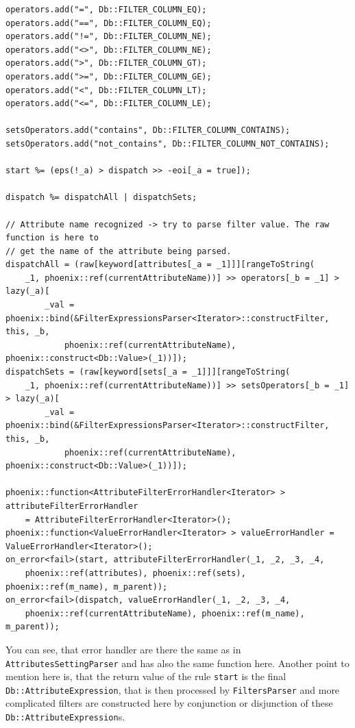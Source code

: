 \documentclass[deska]{subfiles}
\begin{document}
\begin{verbatim}
operators.add("=", Db::FILTER_COLUMN_EQ);
operators.add("==", Db::FILTER_COLUMN_EQ);
operators.add("!=", Db::FILTER_COLUMN_NE);
operators.add("<>", Db::FILTER_COLUMN_NE);
operators.add(">", Db::FILTER_COLUMN_GT);
operators.add(">=", Db::FILTER_COLUMN_GE);
operators.add("<", Db::FILTER_COLUMN_LT);
operators.add("<=", Db::FILTER_COLUMN_LE);

setsOperators.add("contains", Db::FILTER_COLUMN_CONTAINS);
setsOperators.add("not_contains", Db::FILTER_COLUMN_NOT_CONTAINS);

start %= (eps(!_a) > dispatch >> -eoi[_a = true]);

dispatch %= dispatchAll | dispatchSets;

// Attribute name recognized -> try to parse filter value. The raw function is here to
// get the name of the attribute being parsed.
dispatchAll = (raw[keyword[attributes[_a = _1]]][rangeToString(
    _1, phoenix::ref(currentAttributeName))] >> operators[_b = _1] > lazy(_a)[
        _val = phoenix::bind(&FilterExpressionsParser<Iterator>::constructFilter, this, _b,
            phoenix::ref(currentAttributeName), phoenix::construct<Db::Value>(_1))]);
dispatchSets = (raw[keyword[sets[_a = _1]]][rangeToString(
    _1, phoenix::ref(currentAttributeName))] >> setsOperators[_b = _1] > lazy(_a)[
        _val = phoenix::bind(&FilterExpressionsParser<Iterator>::constructFilter, this, _b,
            phoenix::ref(currentAttributeName), phoenix::construct<Db::Value>(_1))]);

phoenix::function<AttributeFilterErrorHandler<Iterator> > attributeFilterErrorHandler
    = AttributeFilterErrorHandler<Iterator>();
phoenix::function<ValueErrorHandler<Iterator> > valueErrorHandler = ValueErrorHandler<Iterator>();
on_error<fail>(start, attributeFilterErrorHandler(_1, _2, _3, _4,
    phoenix::ref(attributes), phoenix::ref(sets), phoenix::ref(m_name), m_parent));
on_error<fail>(dispatch, valueErrorHandler(_1, _2, _3, _4,
    phoenix::ref(currentAttributeName), phoenix::ref(m_name), m_parent));
\end{verbatim}

You can see, that error handler are there the same as in {\tt AttributesSettingParser} and has also the same function here.
Another point to mention here is, that the return value of the rule {\tt start} is the final {\tt Db::AttributeExpression},
that is then processed by {\tt FiltersParser} and more complicated filters are constructed here by conjunction or disjunction
of these {\tt Db::AttributeExpression}s.
\end{document}
